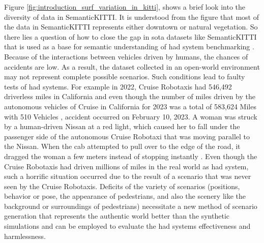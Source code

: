 Figure \ref{fig:introduction_surf_variation_in_kitti}, shows a brief look into the diversity of data in SemanticKITTI. It is understood from the figure that most of the data in SemanticKITTI represents either downtown or natural vegetation. So there lies a question of how to close the gap in \acrfull{sota} datasets like SemanticKITTI that is used as a base for semantic understanding of \acrshort{had} system benchmarking \parencite{papers-with-code}. Because of the interactions between vehicles driven by humans, the chances of accidents are low. As a result, the dataset collected in an open-world environment may not represent complete possible scenarios. Such conditions lead to faulty tests of \acrshort{had} systems. For example in 2022, Cruise Robotaxis had 546,492 driverless miles in California and even though the number of miles driven by the autonomous vehicles of Cruise in California for 2023 was a total of 583,624 Miles with 510 Vehicles \parencite{disengagement_report}, accident occurred on February 10, 2023. A woman was struck by a human-driven Nissan at a red light, which caused her to fall under the passenger side of the autonomous Cruise Robotaxi that was moving parallel to the Nissan. When the cab attempted to pull over to the edge of the road, it dragged the woman a few meters instead of stopping instantly \parencite{cruise_crash}. Even though the Cruise Robotaxis had driven millions of miles in the real world as \acrshort{had} system, such a horrific situation occurred due to the result of a scenario that was never seen by the Cruise Robotaxis. Deficits of the variety of scenarios (positions, behavior or pose, the appearance of pedestrians, and also the scenery like the background or surroundings of pedestrians) necessitate a new method of scenario generation that represents the authentic world better than the synthetic simulations and can be employed to evaluate the \acrshort{had} systems effectiveness and harmlessness.

